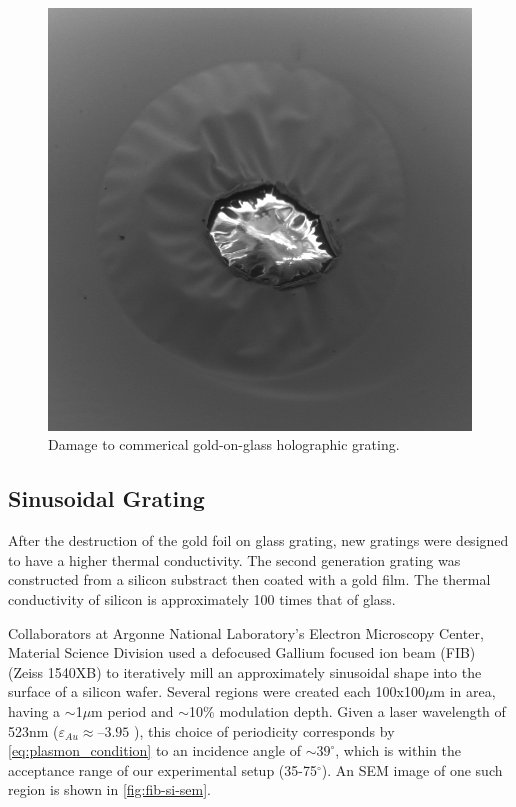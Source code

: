 \begin{figure}
  \centering
  \includegraphics{damage.png}
  \caption{Damage to commerical gold-on-glass holographic grating.}
  \label{fig:grating-damage}
\end{figure}

\subsection{Sinusoidal Grating}

After the destruction of the gold foil on glass grating, new gratings were designed to have a higher thermal conductivity.
The second generation grating was constructed from a silicon substract then coated with a gold film.
The thermal conductivity of silicon is approximately 100 times that of glass. %

Collaborators at Argonne National Laboratory's Electron Microscopy Center, Material Science Division used a defocused Gallium focused ion beam (FIB) (Zeiss 1540XB) to iteratively mill an approximately sinusoidal shape into the surface of a silicon wafer.
Several regions were created each 100x100$\mu$m in area, having a $\sim$1$\mu$m period and $\sim$10\% modulation depth.
Given a laser wavelength of 523nm ($\varepsilon_{Au} \approx –3.95$ \cite{johnson_optical_1972}), this choice of periodicity corresponds by \ref{eq:plasmon_condition} to an incidence angle of $\sim39^{\circ}$, which is within the acceptance range of our experimental setup (35-75$^{\circ}$). %
An SEM image of one such region is shown in \ref{fig:fib-si-sem}.

